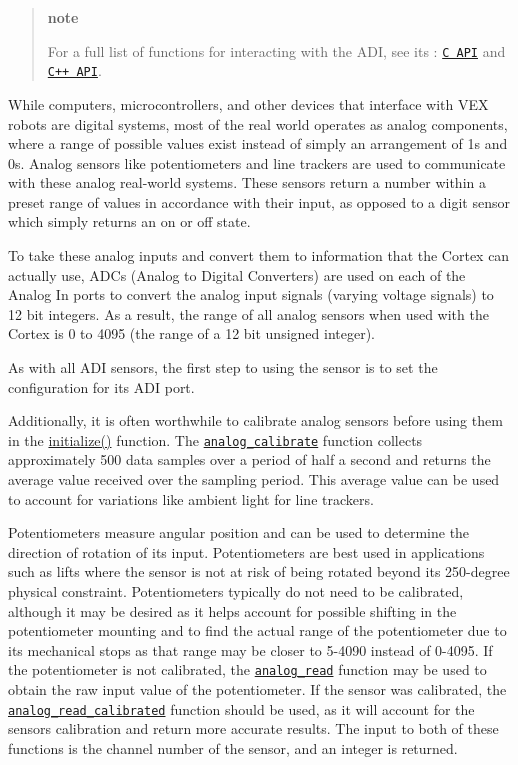 \begin{quote}
{\bfseries note}

For a full list of functions for interacting with the A\+DI, see its \+: \href{../../api/c/adi.html}{\tt C A\+PI} and \href{../../api/cpp/adi.html}{\tt C++ A\+PI}. \end{quote}


While computers, microcontrollers, and other devices that interface with V\+EX robots are digital systems, most of the real world operates as analog components, where a range of possible values exist instead of simply an arrangement of 1s and 0s. Analog sensors like potentiometers and line trackers are used to communicate with these analog real-\/world systems. These sensors return a number within a preset range of values in accordance with their input, as opposed to a digit sensor which simply returns an on or off state.

To take these analog inputs and convert them to information that the Cortex can actually use, A\+D\+Cs (Analog to Digital Converters) are used on each of the Analog In ports to convert the analog input signals (varying voltage signals) to 12 bit integers. As a result, the range of all analog sensors when used with the Cortex is 0 to 4095 (the range of a 12 bit unsigned integer).

As with all A\+DI sensors, the first step to using the sensor is to set the configuration for its A\+DI port.

Additionally, it is often worthwhile to calibrate analog sensors before using them in the {\ttfamily \hyperlink{main_8h_a9efe22aaead3a5e936b5df459de02eba}{initialize()}} function. The \href{../../api/c/adi.html#adi-analog-calibrate}{\tt analog\+\_\+calibrate} function collects approximately 500 data samples over a period of half a second and returns the average value received over the sampling period. This average value can be used to account for variations like ambient light for line trackers.

Potentiometers measure angular position and can be used to determine the direction of rotation of its input. Potentiometers are best used in applications such as lifts where the sensor is not at risk of being rotated beyond its 250-\/degree physical constraint. Potentiometers typically do not need to be calibrated, although it may be desired as it helps account for possible shifting in the potentiometer mounting and to find the actual range of the potentiometer due to its mechanical stops as that range may be closer to 5-\/4090 instead of 0-\/4095. If the potentiometer is not calibrated, the \href{../../api/c/adi.html#adi-analog-read}{\tt analog\+\_\+read} function may be used to obtain the raw input value of the potentiometer. If the sensor was calibrated, the \href{../../api/c/adi.html#adi-analog-read-calibrated}{\tt analog\+\_\+read\+\_\+calibrated} function should be used, as it will account for the sensor\textquotesingle{}s calibration and return more accurate results. The input to both of these functions is the channel number of the sensor, and an integer is returned.

